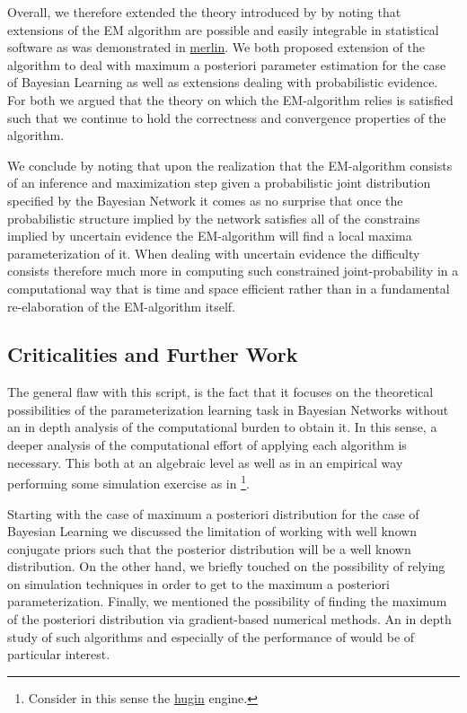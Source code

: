 \documentclass[11pt]{article}
\begin{document}
\begin{article}
Overall, we therefore extended the theory introduced by
\cite{Wasserkrug_all} by noting that extensions of the EM algorithm
are possible and easily integrable in statistical software as was
demonstrated in \href{https://github.com/radum2275/merlin}{merlin}. We both proposed extension of the algorithm
to deal with maximum a posteriori parameter estimation for the case
of Bayesian Learning as well as extensions dealing with
probabilistic evidence. For both we argued that the theory on which
the EM-algorithm relies is satisfied such that we continue to hold
the correctness and convergence properties of the algorithm.

We conclude by noting that upon the realization that the
EM-algorithm consists of an inference and maximization step given a probabilistic
joint distribution specified by the Bayesian Network it comes as no
surprise that once the probabilistic structure implied by the
network satisfies all of the constrains implied by uncertain
evidence the EM-algorithm will find a local maxima parameterization
of it. When dealing with uncertain evidence the difficulty consists
therefore much more in computing such constrained joint-probability
in a computational way that is time and space efficient rather than
in a fundamental re-elaboration of the EM-algorithm itself.

\subsection{Criticalities and Further Work}
\label{sec:orgcbd3512}

The general flaw with this script, is the fact that it focuses
on the theoretical possibilities of the parameterization learning
task in Bayesian Networks without an in depth analysis of the
computational burden to obtain it. In this sense, a deeper analysis
of the computational effort of applying each algorithm is
necessary. This both at an algebraic level as well as in an
empirical way performing some simulation exercise as in
\cite{Wasserkrug_all}\footnote{Consider in this sense the \href{https://www.hugin.com/}{hugin} engine.}.  

Starting with the case of maximum a posteriori distribution for the
case of Bayesian Learning we discussed the limitation of working
with well known conjugate priors such that the posterior
distribution will be a well known distribution. On the other hand,
we briefly touched on the possibility of relying on simulation
techniques in order to get to the maximum a posteriori
parameterization. Finally, we mentioned the possibility of finding
the maximum of the posteriori distribution via gradient-based
numerical methods. An in depth study of such algorithms and
especially of the performance of \cite{meng2016method} would be of
particular interest. 


\end{article}
\end{document}
